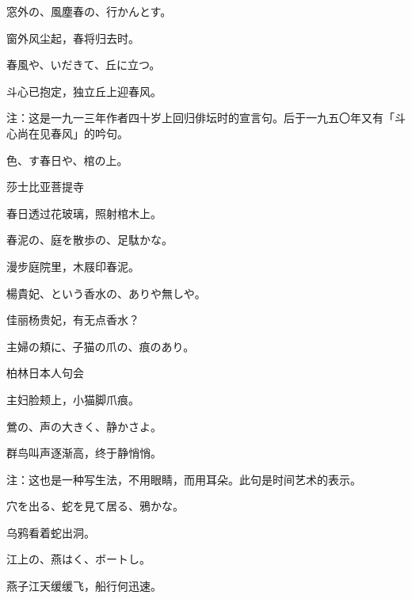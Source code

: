 \begin{haiku}
    {\FH 窓外の、風塵春の、行かんとす。}

    {\FK 窗外风尘起，春将归去时。}
\end{haiku}

\begin{haiku}
    {\FH 春風や、いだきて、丘に立つ。}

    {\FK 斗心已抱定，独立丘上迎春风。}

    {\FT 注：这是一九一三年作者四十岁上回归俳坛时的宣言句。后于一九五〇年又有「斗心尚在见春风」的吟句。}
\end{haiku}

\begin{haiku}
    {\FH 色、す春日や、棺の上。}

    {\FK 莎士比亚菩提寺}

    {\FK 春日透过花玻璃，照射棺木上。}
\end{haiku}

\begin{haiku}
    {\FH 春泥の、庭を散歩の、足駄かな。}

    {\FK 漫步庭院里，木屐印春泥。}
\end{haiku}

\begin{haiku}
    {\FH 楊貴妃、という香水の、ありや無しや。}

    {\FK 佳丽杨贵妃，有无点香水？}
\end{haiku}

\begin{haiku}
    {\FH 主婦の頬に、子猫の爪の、痕のあり。}

    {\FK 柏林日本人句会}

    {\FK 主妇脸颊上，小猫脚爪痕。}
\end{haiku}

\begin{haiku}
    {\FH 鶯の、声の大きく、静かさよ。}

    {\FK 群鸟叫声逐渐高，终于静悄悄。}

    {\FT 注：这也是一种写生法，不用眼睛，而用耳朵。此句是时间艺术的表示。}
\end{haiku}

\begin{haiku}
    {\FH 穴を出る、蛇を見て居る、鴉かな。}

    {\FK 乌鸦看着蛇出洞。}
\end{haiku}

\begin{haiku}
    {\FH 江上の、燕はく、ボートし。}

    {\FK 燕子江天缓缓飞，船行何迅速。}
\end{haiku}

